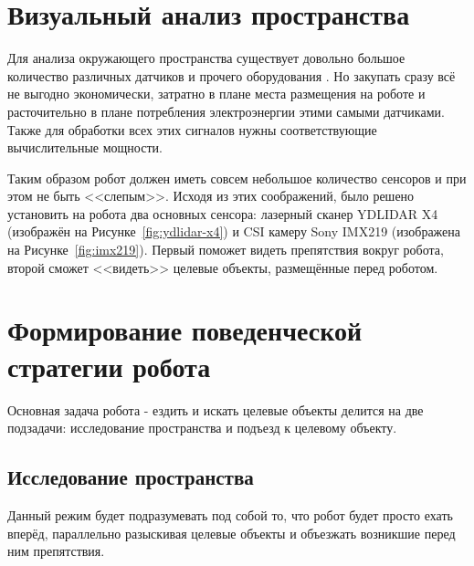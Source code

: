 \section{Визуальный анализ пространства}
Для анализа окружающего пространства существует довольно большое количество различных датчиков и прочего оборудования . Но закупать сразу всё не выгодно экономически, затратно в плане места размещения на роботе и расточительно в плане потребления электроэнергии этими самыми датчиками. Также для обработки всех этих сигналов нужны соответствующие вычислительные мощности. 

Таким образом робот должен иметь совсем небольшое количество сенсоров и при этом не быть <<слепым>>. Исходя из этих соображений, было решено установить на робота два основных сенсора: лазерный сканер YDLIDAR X4 (изображён на Рисунке~\ref{fig:ydlidar-x4}) и CSI камеру Sony IMX219 (изображена на Рисунке~\ref{fig:imx219}). Первый поможет видеть препятствия вокруг робота, второй сможет <<видеть>> целевые объекты, размещённые перед роботом. 

\begin{figure}[ht]
\end{figure}


\section{Формирование поведенческой стратегии робота}

Основная задача робота - ездить и искать целевые объекты делится на две подзадачи: исследование пространства и подъезд к целевому объекту.

\subsection{Исследование пространства}

Данный режим будет подразумевать под собой то, что робот будет просто ехать вперёд, параллельно разыскивая целевые объекты и объезжать возникшие перед ним препятствия. 

